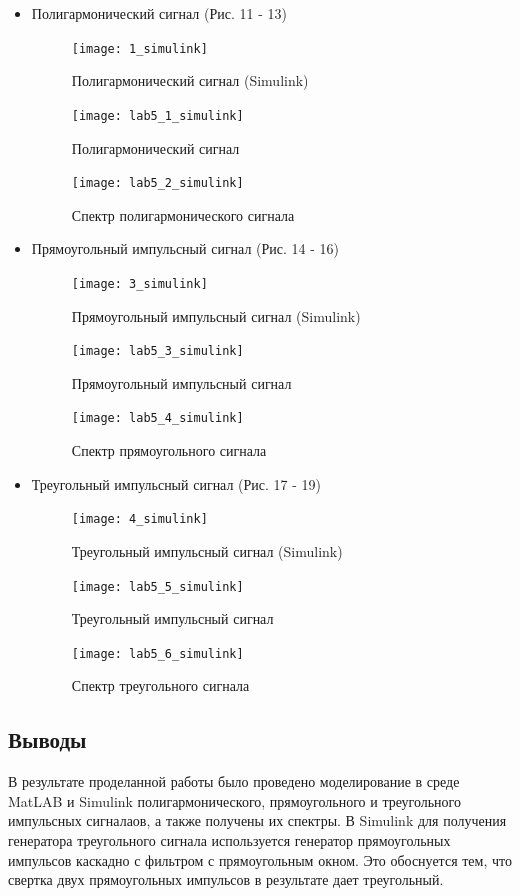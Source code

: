 \documentclass[10pt,a4paper]{article}
\begin{document}
\begin{itemize}
\item Полигармонический сигнал (Рис. 11 - 13)
\begin{figure}[h]
\centering
\texttt{[image: 1\_simulink]} 
\caption{Полигармонический сигнал (Simulink)} 
\label{fig.l5_1s} 
\end{figure}
\begin{figure}[h]
\centering
\texttt{[image: lab5\_1\_simulink]} 
\caption{Полигармонический сигнал} 
\label{fig.l5_2s1} 
\end{figure}
\begin{figure}[h]
\centering
\texttt{[image: lab5\_2\_simulink]}
\caption{Спектр полигармонического сигнала} 
\label{fig.l5_3s} 
\end{figure}

\item Прямоугольный импульсный сигнал (Рис. 14 - 16)
\begin{figure}[h]
\centering
\texttt{[image: 3\_simulink]} 
\caption{Прямоугольный импульсный сигнал (Simulink)} 
\label{fig.l5_4s} 
\end{figure}
\begin{figure}[h]
\centering
\texttt{[image: lab5\_3\_simulink]} 
\caption{Прямоугольный импульсный сигнал} 
\label{fig.l5_5s} 
\end{figure}
\begin{figure}[h]
\centering
\texttt{[image: lab5\_4\_simulink]}
\caption{Спектр прямоугольного сигнала} 
\label{fig.l5_6s} 
\end{figure}

\item Треугольный импульсный сигнал (Рис. 17 - 19)
\begin{figure}[h]
\centering
\texttt{[image: 4\_simulink]} 
\caption{Треугольный импульсный сигнал (Simulink)} 
\label{fig.l5_7s} 
\end{figure}
\begin{figure}[h]
\centering
\texttt{[image: lab5\_5\_simulink]} 
\caption{Треугольный импульсный сигнал} 
\label{fig.l5_8s} 
\end{figure}
\begin{figure}[h]
\centering
\texttt{[image: lab5\_6\_simulink]}
\caption{Спектр треугольного сигнала} 
\label{fig.l5_9s} 
\end{figure}
\end{itemize}
\FloatBarrier
\subsection{Выводы}
В результате проделанной работы было проведено моделирование в среде MatLAB и Simulink полигармонического, прямоугольного и треугольного импульсных сигналаов, а также получены их спектры. В Simulink для получения генератора треугольного сигнала используется генератор прямоугольных импульсов каскадно с фильтром с прямоугольным окном. Это обоснуется тем, что свертка двух прямоугольных импульсов в результате дает треугольный.
\end{document}
